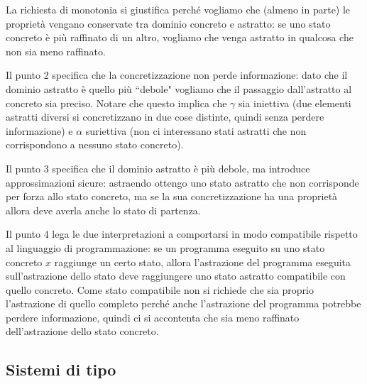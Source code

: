 \documentclass[12pt]{article}
\numberwithin{theorem}{subsection}
\begin{document}
La richiesta di monotonia si giustifica perché vogliamo che (almeno in parte) le proprietà vengano conservate tra dominio concreto e astratto: se uno stato concreto è più raffinato di un altro, vogliamo che venga astratto in qualcosa che non sia meno raffinato.

Il punto 2 specifica che la concretizzazione non perde informazione: dato che il dominio astratto è quello più ``debole" vogliamo che il passaggio dall'astratto al concreto sia preciso. Notare che questo implica che $\gamma$ sia iniettiva (due elementi astratti diversi si concretizzano in due cose distinte, quindi senza perdere informazione) e $\alpha$ suriettiva (non ci interessano stati astratti che non corrispondono a nessuno stato concreto).

Il punto 3 specifica che il dominio astratto è più debole, ma introduce approssimazioni sicure: astraendo ottengo uno stato astratto che non corrisponde per forza allo stato concreto, ma se la sua concretizzazione ha una proprietà allora deve averla anche lo stato di partenza.

Il punto 4 lega le due interpretazioni a comportarsi in modo compatibile rispetto al linguaggio di programmazione: se un programma eseguito su uno stato concreto $x$ raggiunge un certo stato, allora l'astrazione del programma eseguita sull'astrazione dello stato deve raggiungere uno stato astratto compatibile con quello concreto. Come stato compatibile non si richiede che sia proprio l'astrazione di quello completo perché anche l'astrazione del programma potrebbe perdere informazione, quindi ci si accontenta che sia meno raffinato dell'astrazione dello stato concreto.



\subsection{Sistemi di tipo}
\end{document}
